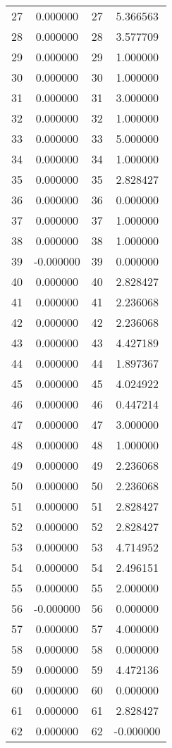 \documentclass[12pt]{article}
\begin{document}
\begin{longtable}{@{}cccc@{}}
27 & 0.000000 & 27 & 5.366563 \\
28 & 0.000000 & 28 & 3.577709 \\
29 & 0.000000 & 29 & 1.000000 \\
30 & 0.000000 & 30 & 1.000000 \\
31 & 0.000000 & 31 & 3.000000 \\
32 & 0.000000 & 32 & 1.000000 \\
33 & 0.000000 & 33 & 5.000000 \\
34 & 0.000000 & 34 & 1.000000 \\
35 & 0.000000 & 35 & 2.828427 \\
36 & 0.000000 & 36 & 0.000000 \\
37 & 0.000000 & 37 & 1.000000 \\
38 & 0.000000 & 38 & 1.000000 \\
39 & -0.000000 & 39 & 0.000000 \\
40 & 0.000000 & 40 & 2.828427 \\
41 & 0.000000 & 41 & 2.236068 \\
42 & 0.000000 & 42 & 2.236068 \\
43 & 0.000000 & 43 & 4.427189 \\
44 & 0.000000 & 44 & 1.897367 \\
45 & 0.000000 & 45 & 4.024922 \\
46 & 0.000000 & 46 & 0.447214 \\
47 & 0.000000 & 47 & 3.000000 \\
48 & 0.000000 & 48 & 1.000000 \\
49 & 0.000000 & 49 & 2.236068 \\
50 & 0.000000 & 50 & 2.236068 \\
51 & 0.000000 & 51 & 2.828427 \\
52 & 0.000000 & 52 & 2.828427 \\
53 & 0.000000 & 53 & 4.714952 \\
54 & 0.000000 & 54 & 2.496151 \\
55 & 0.000000 & 55 & 2.000000 \\
56 & -0.000000 & 56 & 0.000000 \\
57 & 0.000000 & 57 & 4.000000 \\
58 & 0.000000 & 58 & 0.000000 \\
59 & 0.000000 & 59 & 4.472136 \\
60 & 0.000000 & 60 & 0.000000 \\
61 & 0.000000 & 61 & 2.828427 \\
62 & 0.000000 & 62 & -0.000000 \\

\end{longtable}
\end{document}
